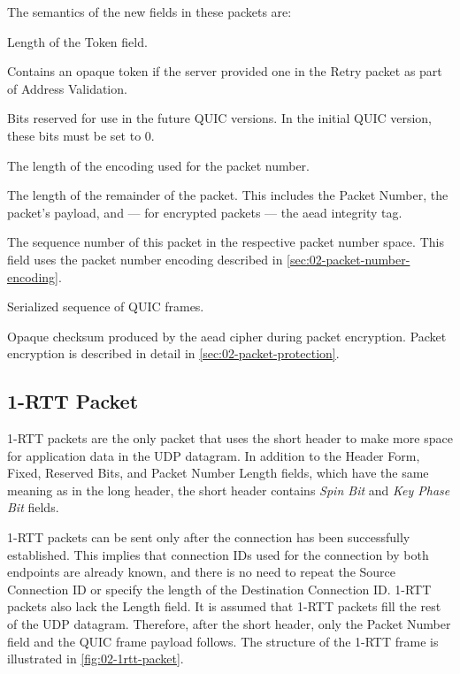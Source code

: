 The semantics of the new fields in these packets are:

\begin{description}

     Length of the Token field.

     Contains an opaque token if the server provided one in
the Retry packet as part of Address Validation.

     Bits reserved for use in the future QUIC versions. In the initial QUIC
version, these bits must be set to 0.

     The length of the encoding used for the packet number.

     The length of the remainder of the packet. This includes the Packet Number, the
packet's payload, and --- for encrypted packets --- the \gls{aead} integrity tag.

     The sequence number of this packet in the respective packet number space.
This field uses the packet number encoding described in \autoref{sec:02-packet-number-encoding}.

     Serialized sequence of QUIC frames.

     Opaque checksum produced by the \gls{aead} cipher during packet encryption.
Packet encryption is described in detail in \autoref{sec:02-packet-protection}.

\end{description}

\subsection{1-RTT Packet}

1-RTT packets are the only packet that uses the short header to make more space for application data
in the UDP datagram. In addition to the Header Form, Fixed, Reserved Bits, and Packet Number Length
fields, which have the same meaning as in the long header, the short header contains \textit{Spin
Bit} and \textit{Key Phase Bit} fields.

1-RTT packets can be sent only after the connection has been successfully established. This implies
that connection IDs used for the connection by both endpoints are already known, and there is no
need to repeat the Source Connection ID or specify the length of the Destination Connection ID.
1-RTT packets also lack the Length field. It is assumed that 1-RTT packets fill the rest of the UDP
datagram. Therefore, after the short header, only the Packet Number field and the QUIC frame payload
follows. The structure of the 1-RTT frame is illustrated in \autoref{fig:02-1rtt-packet}.

